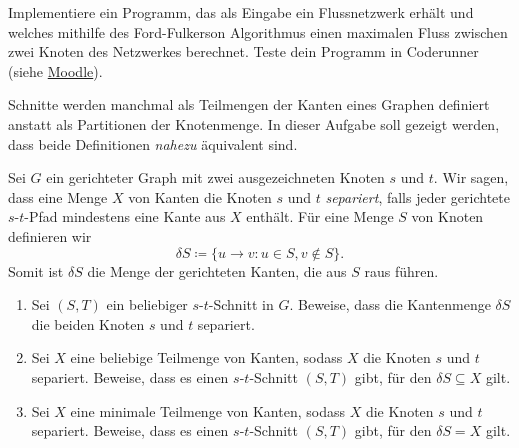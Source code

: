 \documentclass{uebung_cs}
\begin{document}
\begin{aufgabe}
    Implementiere ein Programm, das als Eingabe ein Flussnetzwerk erhält und welches mithilfe des Ford-Fulkerson Algorithmus einen maximalen Fluss zwischen zwei Knoten des Netzwerkes berechnet.
    Teste dein Programm in Coderunner (siehe \href{https://moodle.studiumdigitale.uni-frankfurt.de/moodle/course/view.php?id=2241}{Moodle}).
\end{aufgabe}

\begin{aufgabe}
  Schnitte werden manchmal als Teilmengen der Kanten eines Graphen definiert anstatt als Partitionen der Knotenmenge.
  In dieser Aufgabe soll gezeigt werden, dass beide Definitionen \emph{nahezu} äquivalent sind.

  Sei $G$ ein gerichteter Graph mit zwei ausgezeichneten Knoten $s$ und $t$. Wir sagen, dass eine Menge $X$ von Kanten die Knoten $s$ und $t$ \emph{separiert}, falls jeder gerichtete $s$-$t$-Pfad mindestens eine Kante aus $X$ enthält.
  Für eine Menge $S$ von Knoten definieren wir
  \[δS \coloneqq \{u \to v : u \in S, v \not\in S\}.\]
  Somit ist $δS$ die Menge der gerichteten Kanten, die aus $S$ raus führen.

  \begin{enumerate}
    \item Sei $(S,T)$ ein beliebiger $s$-$t$-Schnitt in $G$. Beweise, dass die Kantenmenge $δS$ die beiden Knoten $s$ und $t$ separiert.
    \item Sei $X$ eine beliebige Teilmenge von Kanten, sodass $X$ die Knoten $s$ und $t$ separiert.
    Beweise, dass es einen $s$-$t$-Schnitt $(S,T)$ gibt, für den $δS \subseteq X$ gilt.
    \item Sei $X$ eine minimale Teilmenge von Kanten, sodass $X$ die Knoten $s$ und $t$ separiert.
    Beweise, dass es einen $s$-$t$-Schnitt $(S,T)$ gibt, für den $δS = X$ gilt.
  \end{enumerate}
\end{aufgabe}
\end{document}
